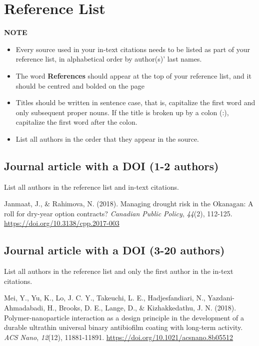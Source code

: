 \documentclass[
]{book}
\providecommand{\tightlist}{%
  \setlength{\itemsep}{0pt}\setlength{\parskip}{0pt}}
\begin{document}
\hypertarget{reference-list}{%
\section{Reference List}\label{reference-list}}

\textbf{NOTE}

\begin{itemize}
\tightlist
\item
  Every source used in your in-text citations needs to be listed as part of your reference list, in alphabetical order by author(s)' last names.
\item
  The word \textbf{References} should appear at the top of your reference list, and it should be centred and bolded on the page
\item
  Titles should be written in sentence case, that is, capitalize the first word and only subsequent proper nouns. If the title is broken up by a colon (:), capitalize the first word after the colon.
\item
  List all authors in the order that they appear in the source.
\end{itemize}

\hypertarget{journal-article-with-a-doi-1-2-authors}{%
\subsection*{Journal article with a DOI (1-2 authors)}\label{journal-article-with-a-doi-1-2-authors}}

List all authors in the reference list and in-text citations.

Janmaat, J., \& Rahimova, N. (2018). Managing drought risk in the Okanagan: A roll for dry-year option contracts? \emph{Canadian Public Policy}, \emph{44}(2), 112-125. \url{https://doi.org/10.3138/cpp.2017-003}

\hypertarget{journal-article-with-a-doi-3-20-authors}{%
\subsection*{Journal article with a DOI (3-20 authors)}\label{journal-article-with-a-doi-3-20-authors}}

List all authors in the reference list and only the first author in the in-text citations.

Mei, Y., Yu, K., Lo, J. C. Y., Takeuchi, L. E., Hadjesfandiari, N., Yazdani-Ahmadabadi, H., Brooks, D. E., Lange, D., \& Kizhakkedathu, J. N. (2018). Polymer-nanoparticle interaction as a design principle in the development of a durable ultrathin universal binary antibiofilm coating with long-term activity. \emph{ACS Nano}, \emph{12}(12), 11881-11891. \url{https://doi.org/10.1021/acsnano.8b05512}
\end{document}
